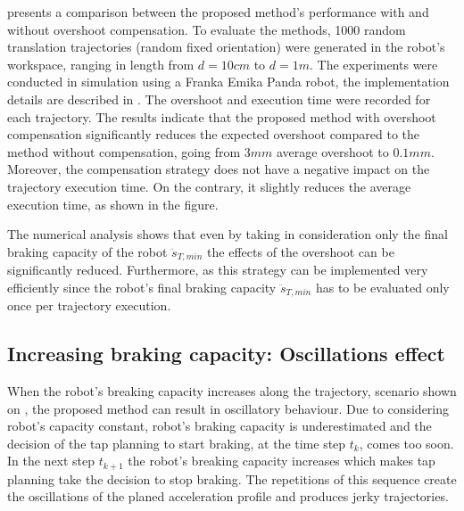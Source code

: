  presents a comparison between the proposed method's performance with and without overshoot compensation. To evaluate the methods, 1000 random translation trajectories (random fixed orientation) were generated in the robot's workspace, ranging in length from $d\!=\!10cm$ to $d\!=\!1m$. The experiments were conducted in simulation using a Franka Emika Panda robot, the implementation details are described in . The overshoot and execution time were recorded for each trajectory. The results indicate that the proposed method with overshoot compensation significantly reduces the expected overshoot compared to the method without compensation, going from $3mm$ average overshoot to $0.1mm$. Moreover, the compensation strategy does not have a negative impact on the trajectory execution time. On the contrary, it slightly reduces the average execution time, as shown in the figure.

The numerical analysis shows that even by taking in consideration only the final braking capacity of the robot $\ddot{s}_{T,min}$ the effects of the overshoot can be significantly reduced. Furthermore, as this strategy can be implemented very efficiently since the robot's final braking capacity $\ddot{s}_{T,min}$ has to be evaluated only once per trajectory execution. 

\subsection{Increasing braking capacity: Oscillations effect}
\label{ch:oscillations}
When the robot's breaking capacity increases along the trajectory, scenario shown on , the proposed method can result in oscillatory behaviour.  Due to considering robot's capacity constant, robot's braking capacity is underestimated and the decision of the \gls{tap} planning to start braking, at the time step $t_k$, comes too soon. In the next step $t_{k+1}$ the robot's breaking capacity increases which makes \gls{tap}  planning take the decision to stop braking. The repetitions of this sequence create the oscillations of the planed acceleration profile and produces jerky trajectories. 

